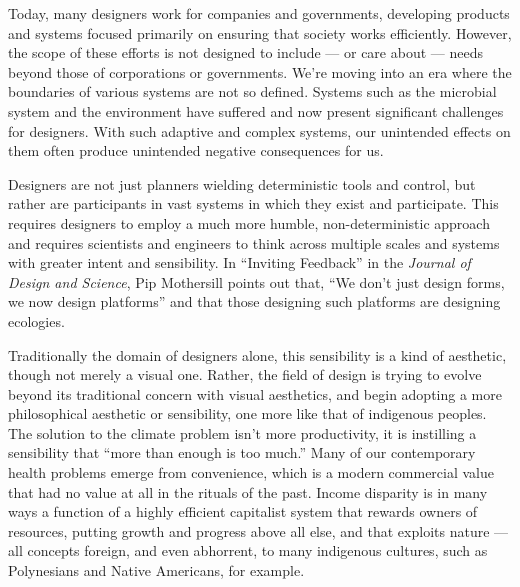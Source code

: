 Today, many designers work for companies and governments, developing products and systems focused primarily on ensuring that society works efficiently. However, the scope of these efforts is not designed to include --- or care about --- needs beyond those of corporations or governments. We're moving into an era where the boundaries of various systems are not so defined. Systems such as the microbial system and the environment have suffered and now present significant challenges for designers. With such adaptive and complex systems, our unintended effects on them often produce unintended negative consequences for us.

Designers are not just planners wielding deterministic tools and control, but rather are participants in vast systems in which they exist and participate. This requires designers to employ a much more humble, non-deterministic approach and requires scientists and engineers to think across multiple scales and systems with greater intent and sensibility. In ``Inviting Feedback'' in the \textit{Journal of Design and Science}, Pip Mothersill points out that, ``We don’t just design forms, we now design platforms'' \cite{mothersill_inviting_2018} and that those designing such platforms are designing ecologies.

Traditionally the domain of designers alone, this sensibility is a kind of aesthetic, though not merely a visual one. Rather, the field of design is trying to evolve beyond its traditional concern with visual aesthetics, and begin adopting a more philosophical aesthetic or sensibility, one more like that of indigenous peoples. The solution to the climate problem isn't more productivity, it is instilling a sensibility that ``more than enough is too much.'' Many of our contemporary health problems emerge from convenience, which is a modern commercial value that had no value at all in the rituals of the past. Income disparity is in many ways a function of a highly efficient capitalist system that rewards owners of resources, putting growth and progress above all else, and that exploits nature --- all concepts foreign, and even abhorrent, to many indigenous cultures, such as Polynesians and Native Americans, for example.

